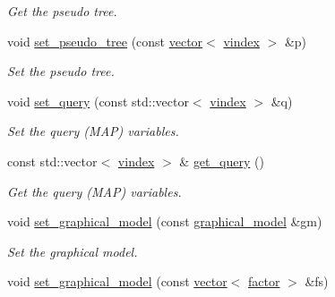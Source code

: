 \begin{DoxyCompactItemize}
\begin{DoxyCompactList}\small\item\em Get the pseudo tree. \end{DoxyCompactList}\item 
\hypertarget{classmerlin_1_1wmb_a44f662696a361d292f0b0088487ed7a1}{}void \hyperlink{classmerlin_1_1wmb_a44f662696a361d292f0b0088487ed7a1}{set\+\_\+pseudo\+\_\+tree} (const \hyperlink{classmerlin_1_1vector}{vector}$<$ \hyperlink{classmerlin_1_1wmb_ab942720d1c65e0002674af4eeade660f}{vindex} $>$ \&p)\label{classmerlin_1_1wmb_a44f662696a361d292f0b0088487ed7a1}

\begin{DoxyCompactList}\small\item\em Set the pseudo tree. \end{DoxyCompactList}\item 
\hypertarget{classmerlin_1_1wmb_ae17b4c453a873d89925776cfc0773b5d}{}void \hyperlink{classmerlin_1_1wmb_ae17b4c453a873d89925776cfc0773b5d}{set\+\_\+query} (const std\+::vector$<$ \hyperlink{classmerlin_1_1wmb_ab942720d1c65e0002674af4eeade660f}{vindex} $>$ \&q)\label{classmerlin_1_1wmb_ae17b4c453a873d89925776cfc0773b5d}

\begin{DoxyCompactList}\small\item\em Set the query (M\+A\+P) variables. \end{DoxyCompactList}\item 
\hypertarget{classmerlin_1_1wmb_a1ff63d89f0dd759ab184712335396393}{}const std\+::vector$<$ \hyperlink{classmerlin_1_1wmb_ab942720d1c65e0002674af4eeade660f}{vindex} $>$ \& \hyperlink{classmerlin_1_1wmb_a1ff63d89f0dd759ab184712335396393}{get\+\_\+query} ()\label{classmerlin_1_1wmb_a1ff63d89f0dd759ab184712335396393}

\begin{DoxyCompactList}\small\item\em Get the query (M\+A\+P) variables. \end{DoxyCompactList}\item 
\hypertarget{classmerlin_1_1wmb_a8308f0c51a3f354e66d38f6639eebadf}{}void \hyperlink{classmerlin_1_1wmb_a8308f0c51a3f354e66d38f6639eebadf}{set\+\_\+graphical\+\_\+model} (const \hyperlink{classmerlin_1_1graphical__model}{graphical\+\_\+model} \&gm)\label{classmerlin_1_1wmb_a8308f0c51a3f354e66d38f6639eebadf}

\begin{DoxyCompactList}\small\item\em Set the graphical model. \end{DoxyCompactList}\item 
\hypertarget{classmerlin_1_1wmb_a5d4249884de8c97b00a5a58ce9b18c56}{}void \hyperlink{classmerlin_1_1wmb_a5d4249884de8c97b00a5a58ce9b18c56}{set\+\_\+graphical\+\_\+model} (const \hyperlink{classmerlin_1_1vector}{vector}$<$ \hyperlink{classmerlin_1_1factor}{factor} $>$ \&fs)\label{classmerlin_1_1wmb_a5d4249884de8c97b00a5a58ce9b18c56}


\end{DoxyCompactItemize}
